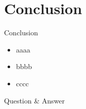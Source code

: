 \documentclass{beamer}
\begin{document}
%
\section{Conclusion}
\begin{frame}{Conclusion}
    \begin{itemize}
        \item<1->aaaa
        \item<2->bbbb
        \item<3->cccc
    \end{itemize}
\end{frame}

%
\begin{frame}[standout]
    Question \& Answer
\end{frame}
\end{document}

